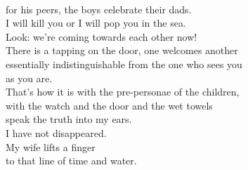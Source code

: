 \documentclass[smalldemyvopaper,11pt,twoside,onecolumn,openright,extrafontsizes]{memoir}
\begin{document}
\\for his peers, the boys celebrate their dads.
\\I will kill you or I will pop you in the sea.
\\Look: we're coming towards each other now!
\\There is a tapping on the door, one welcomes another
\\essentially indistinguishable from the one who sees you
\\as you are.
\\That's how it is with the pre-personae of the children,
\\with the watch and the door and the wet towels
\\speak the truth into my ears.
\\I have not disappeared.
\\My wife lifts a finger
\\to that line of time and water.
\end{document}
